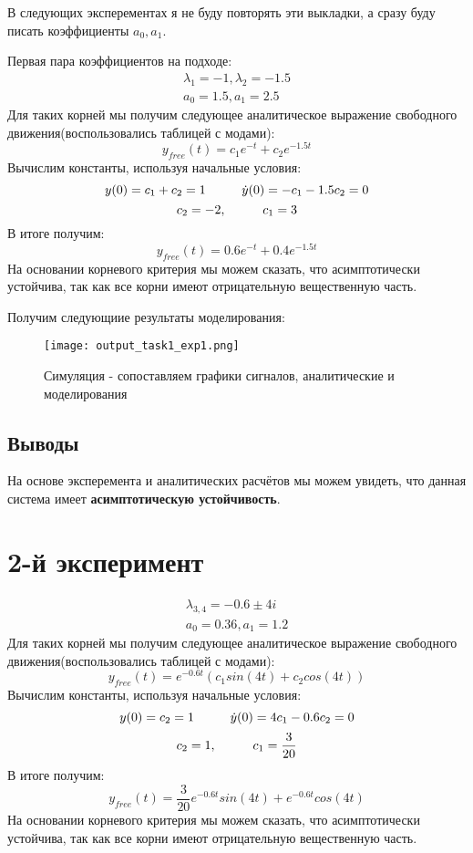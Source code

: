 В следующих эксперементах я не буду повторять эти выкладки, а сразу буду писать коэффициенты $a_0, a_1$.

Первая пара коэффициентов на подходе:
$$
\begin{aligned}
    \lambda_1 = -1, \lambda_2 = -1.5 \\
    a_0 = 1.5, a_1 = 2.5
\end{aligned}
$$
Для таких корней мы получим следующее аналитическое выражение свободного движения(воспользовались таблицей с модами):
$$
y_{free}(t) = c_1e^{-t} + c_2e^{-1.5t}
$$
Вычислим константы, используя начальные условия:
$$
    y(0) = c_1 + c_2 = 1 \hspace*{1cm} \dot{y}(0) = -c_1 - 1.5c_2 = 0 
$$
$$
    c_2 = -2, \hspace*{1cm} c_1 = 3
$$
В итоге получим:
$$
y_{free}(t) = 0.6e^{-t} + 0.4e^{-1.5t}
$$
На основании корневого критерия мы можем сказать, что асимптотически устойчива, так как все корни имеют отрицательную вещественную часть.

Получим следующиие результаты моделирования:
\begin{figure}[ht]
    \centering
    \texttt{[image: output\_task1\_exp1.png]}
	\caption{Симуляция - сопоставляем графики сигналов, аналитические и моделирования}
\end{figure}
\subsection{Выводы}
На основе эксперемента и аналитических расчётов мы можем увидеть, что данная система имеет \textbf{асимптотическую устойчивость}.


\newpage
\section{2-й эксперимент}
$$
\begin{aligned}
    \lambda_{3,4} = -0.6 \pm 4i \\
    a_0 = 0.36, a_1 = 1.2
\end{aligned}
$$
Для таких корней мы получим следующее аналитическое выражение свободного движения(воспользовались таблицей с модами):
$$
y_{free}(t) = e^{-0.6t}(c_1sin(4t) + c_2cos(4t))
$$
Вычислим константы, используя начальные условия:
$$
    y(0) = c_2 = 1 \hspace*{1cm} \dot{y}(0) = 4c_1 - 0.6c_2 = 0 
$$
$$
    c_2 = 1, \hspace*{1cm} c_1 = \frac{3}{20}
$$
В итоге получим:
$$
y_{free}(t) =  \frac{3}{20}e^{-0.6t}sin(4t) + e^{-0.6t}cos(4t)
$$
На основании корневого критерия мы можем сказать, что асимптотически устойчива, так как все корни имеют отрицательную вещественную часть.

